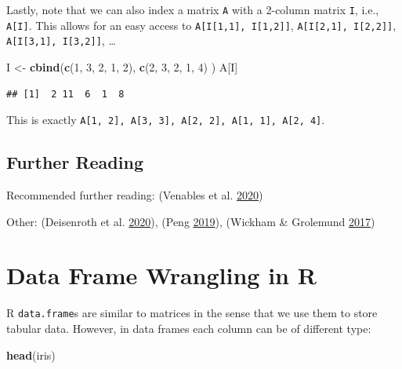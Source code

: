 \documentclass[10pt,b5paper,krantz1]{krantz}
\newenvironment{Shaded}{\begin{snugshade}}{\end{snugshade}}
\newcommand{\DecValTok}[1]{\textcolor[rgb]{0.06,0.06,0.06}{#1}}
\newcommand{\KeywordTok}[1]{\textcolor[rgb]{0.27,0.27,0.27}{\textbf{#1}}}
\newcommand{\NormalTok}[1]{#1}
\newcommand{\StringTok}[1]{\textcolor[rgb]{0.5,0.5,0.5}{#1}}
\begin{document}
Lastly, note that we can also index a matrix \texttt{A}
with a 2-column matrix \texttt{I}, i.e., \texttt{A{[}I{]}}.
This allows for an easy access to
\texttt{A{[}I{[}1,1{]},\ I{[}1,2{]}{]}}, \texttt{A{[}I{[}2,1{]},\ I{[}2,2{]}{]}}, \texttt{A{[}I{[}3,1{]},\ I{[}3,2{]}{]}}, \ldots{}

\begin{Shaded}
\begin{Highlighting}[]
\NormalTok{I <-}\StringTok{ }\KeywordTok{cbind}\NormalTok{(}\KeywordTok{c}\NormalTok{(}\DecValTok{1}\NormalTok{, }\DecValTok{3}\NormalTok{, }\DecValTok{2}\NormalTok{, }\DecValTok{1}\NormalTok{, }\DecValTok{2}\NormalTok{),}
           \KeywordTok{c}\NormalTok{(}\DecValTok{2}\NormalTok{, }\DecValTok{3}\NormalTok{, }\DecValTok{2}\NormalTok{, }\DecValTok{1}\NormalTok{, }\DecValTok{4}\NormalTok{)}
\NormalTok{)}
\NormalTok{A[I]}
\end{Highlighting}
\end{Shaded}

\begin{verbatim}
## [1]  2 11  6  1  8
\end{verbatim}

This is exactly
\texttt{A{[}1,\ 2{]},\ A{[}3,\ 3{]},\ A{[}2,\ 2{]},\ A{[}1,\ 1{]},\ A{[}2,\ 4{]}}.

\hypertarget{further-reading-10}{%
\section{Further Reading}\label{further-reading-10}}

Recommended further reading: (Venables et al. \protect\hyperlink{ref-Rintro}{2020})

Other: (Deisenroth et al. \protect\hyperlink{ref-mml}{2020}), (Peng \protect\hyperlink{ref-rprogdatascience}{2019}), (Wickham \& Grolemund \protect\hyperlink{ref-r4ds}{2017})

\hypertarget{data-frame-wrangling-in-r}{%
\chapter{Data Frame Wrangling in R}\label{data-frame-wrangling-in-r}}

R \texttt{data.frame}s are similar to matrices in the sense that
we use them to store tabular data.
However, in data frames each column can be of different type:

\begin{Shaded}
\begin{Highlighting}[]
\KeywordTok{head}\NormalTok{(iris)}
\end{Highlighting}
\end{Shaded}
\end{document}
